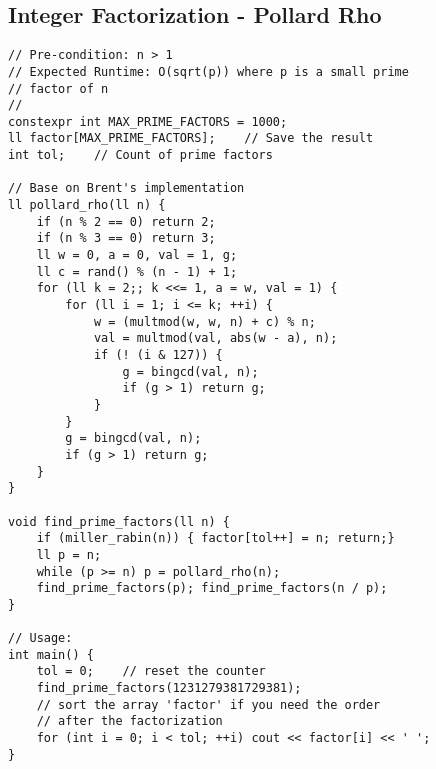 \documentclass[10pt]{article}{\twocolumn}
\begin{document}
\subsection{Integer Factorization - Pollard Rho}
\begin{lstlisting}
// Pre-condition: n > 1
// Expected Runtime: O(sqrt(p)) where p is a small prime
// factor of n
//
constexpr int MAX_PRIME_FACTORS = 1000;
ll factor[MAX_PRIME_FACTORS];    // Save the result
int tol;    // Count of prime factors

// Base on Brent's implementation
ll pollard_rho(ll n) {
    if (n % 2 == 0) return 2;
    if (n % 3 == 0) return 3;
    ll w = 0, a = 0, val = 1, g;
    ll c = rand() % (n - 1) + 1;
    for (ll k = 2;; k <<= 1, a = w, val = 1) {
        for (ll i = 1; i <= k; ++i) {
            w = (multmod(w, w, n) + c) % n;
            val = multmod(val, abs(w - a), n);
            if (! (i & 127)) {
                g = bingcd(val, n);
                if (g > 1) return g;
            }
        }
        g = bingcd(val, n);
        if (g > 1) return g;
    }
}

void find_prime_factors(ll n) {
    if (miller_rabin(n)) { factor[tol++] = n; return;}
    ll p = n;
    while (p >= n) p = pollard_rho(n);
    find_prime_factors(p); find_prime_factors(n / p);
}

// Usage:
int main() {
    tol = 0;    // reset the counter
    find_prime_factors(1231279381729381);
    // sort the array 'factor' if you need the order
    // after the factorization
    for (int i = 0; i < tol; ++i) cout << factor[i] << ' ';
}
\end{lstlisting}
\end{document}
